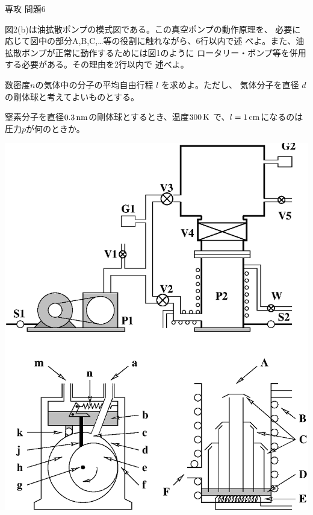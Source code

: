 \documentclass[fleqn]{jbook}
\begin{document}
\begin{question}{専攻 問題6}{}
\begin{subquestions}
\begin{subsubquestions}
  \SubSubQuestion
    図2(b)は油拡散ポンプの模式図である。この真空ポンプの動作原理を、
    必要に応じて図中の部分A,B,C,…等の役割に触れながら、6行以内で述
    べよ。また、油拡散ポンプが正常に動作するためには図1のように
    ロータリー・ポンプ等を併用する必要がある。その理由を2行以内で
    述べよ。

  \end{subsubquestions}

\SubQuestion
  \begin{subsubquestions}
  \SubSubQuestion
    数密度$n$の気体中の分子の平均自由行程 $l$ を求めよ。ただし、
    気体分子を直径 $d$ の剛体球と考えてよいものとする。

  \SubSubQuestion
    窒素分子を直径$0.3\,{\rm nm}$の剛体球とするとき、温度$300\,{\rm K}$
    で、$l=1\,{\rm cm}$になるのは圧力$p$が何のときか。
  \end{subsubquestions}
\end{subquestions}
\newpage

\begin{center}
  \mbox{\includegraphics[clip]{1995phy6-1.eps}}
\end{center}

\end{question}
\end{document}
